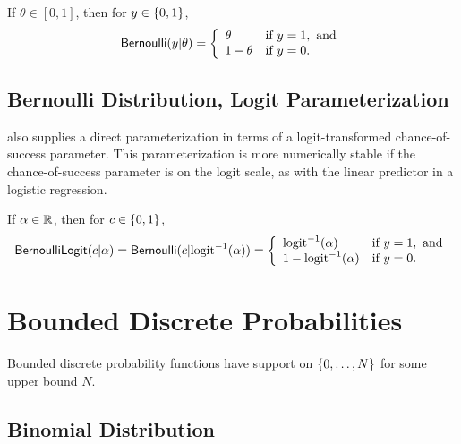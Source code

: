 If $\theta \in [0,1]$, then for $y \in \{ 0,1 \}$, 
\[
\mbox{\sf Bernoulli}(y|\theta)
=
\left\{
\begin{array}{ll}
\theta & \mbox{if } y = 1, \mbox{ and}
\\
1 - \theta & \mbox{if } y = 0.
\end{array}
\right.
\]
\begin{description}
%
%
\end{description}

\subsection{Bernoulli Distribution, Logit Parameterization}

\Stan also supplies a direct parameterization in terms of a
logit-transformed chance-of-success parameter.  This parameterization
is more numerically stable if the chance-of-success parameter is on
the logit scale, as with the linear predictor in a logistic
regression.  

If $\alpha \in \mathbb{R}$, then for $c \in \{ 0,1 \}$,
\[
\mbox{\sf BernoulliLogit}(c|\alpha)
=
\mbox{\sf Bernoulli}(c|\mbox{logit}^{-1}(\alpha))
= 
\left\{
\begin{array}{ll}
\mbox{logit}^{-1}(\alpha) & \mbox{if } y = 1, \mbox{ and}
\\
1 - \mbox{logit}^{-1}(\alpha) & \mbox{if } y = 0.
\end{array}
\right.
\]
\begin{description}
%
%
\end{description}

\section{Bounded Discrete Probabilities}\label{betafun.section}

Bounded discrete probability functions have support on
$\{ 0,\ldots,N \}$ for some upper bound $N$.

\subsection{Binomial Distribution}

